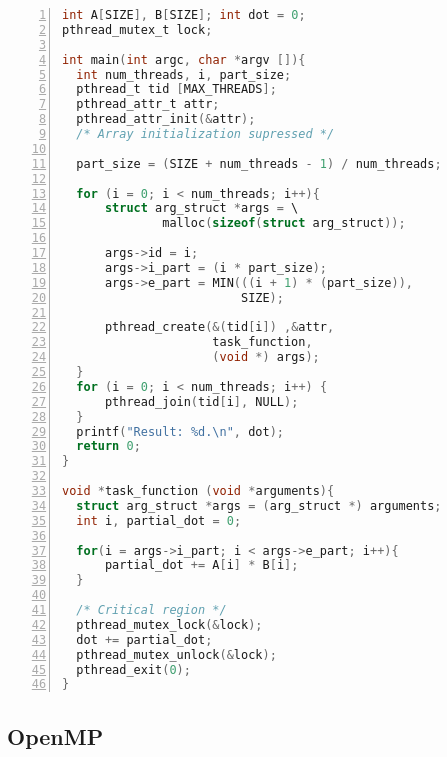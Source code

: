\begin{lstlisting}[language=C, basicstyle=\ttfamily\scriptsize, numbers=left,
                   frame=no, showspaces=false, showstringspaces=false,
                   caption={\textit{Pthreads} Sample Program}, captionpos=b,
                   numberstyle=\tiny,
                   xleftmargin=0.5cm,
                   label=lst:pthreads, keywords={%
                       DATATYPE, pthread_t, pthread_create,
                       pthread_join, task_function, NULL, int, main,
                       void, printf, return, pthread_mutex_t,
                       pthread_attr_t, pthread_attr_init,
                       MAX_THREADS, SIZE, char, struct, malloc,
                       MIN, pthread_mutex_lock, pthread_mutex_unlock,
                       pthread_exit%
                       },
                   otherkeywords={::, \#pragma, \#include, <<<,>>>, \&, \*, +, -, /, [, ], >, <}
                   ]
int A[SIZE], B[SIZE]; int dot = 0;
pthread_mutex_t lock;

int main(int argc, char *argv []){
  int num_threads, i, part_size;
  pthread_t tid [MAX_THREADS];
  pthread_attr_t attr;
  pthread_attr_init(&attr);
  /* Array initialization supressed */

  part_size = (SIZE + num_threads - 1) / num_threads;

  for (i = 0; i < num_threads; i++){
      struct arg_struct *args = \
              malloc(sizeof(struct arg_struct));

      args->id = i;
      args->i_part = (i * part_size);
      args->e_part = MIN(((i + 1) * (part_size)),
                         SIZE);

      pthread_create(&(tid[i]) ,&attr,
                     task_function,
                     (void *) args);
  }
  for (i = 0; i < num_threads; i++) {
      pthread_join(tid[i], NULL);
  }
  printf("Result: %d.\n", dot);
  return 0;
}

void *task_function (void *arguments){
  struct arg_struct *args = (arg_struct *) arguments;
  int i, partial_dot = 0;

  for(i = args->i_part; i < args->e_part; i++){
      partial_dot += A[i] * B[i];
  }

  /* Critical region */
  pthread_mutex_lock(&lock);
  dot += partial_dot;
  pthread_mutex_unlock(&lock);
  pthread_exit(0);
}
\end{lstlisting}

\subsection{OpenMP}

